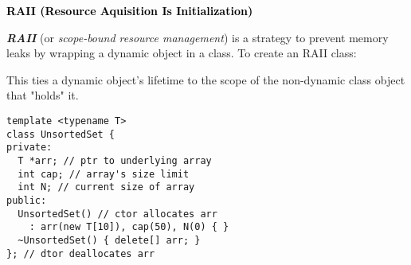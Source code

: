 \documentclass[6.6pt, twocolumn]{extarticle}
\newcommand{\blueheader}[1]{\textcolor{black}{\fontsize{7.00pt}{1.0}\bfseries{#1}}\vspace{0.2ex} }
\newcommand{\vocab}[1]{\textcolor{vocabcolor}{\bfseries{\emph{#1}}}}
\newcommand\mystrut{\rule[-0.5pt]{0pt}{0.875em}} %
\newcommand{\code}[1]{\mbox{%
    \fontsize{5.75pt}{1.17}\ttfamily\mystrut
    \tcbox[
        on line,
        boxsep=0.1pt, left=1.0pt, right=1.0pt, top=0.75pt, bottom=0.75pt,
        toprule=0pt, rightrule=0pt, bottomrule=0pt, leftrule=0pt,
        oversize=0pt, enlarge left by=0pt, enlarge right by=0pt,
        colframe=black!16,colback=inlinecodeBG,arc=0.8pt,boxrule=0.4pt,fontupper={\ttfamily\mystrut}
    ]{#1}%
}%
}
\begin{document}



\smallskip
\begin{minipage}[c]{5.5cm}
\blueheader{RAII (Resource Aquisition Is Initialization)}

\vocab{RAII} (or \textit{scope-bound resource management}) is a strategy to prevent memory leaks by wrapping a dynamic object in a class. To create an RAII class:
This ties a dynamic object's lifetime to the scope of the non-dynamic class object that "holds" it.
    \end{minipage}
    \hspace{0pt}
   \begin{minipage}[c]{4.7cm} 
   \smallskip
      \begin{tcolorbox}[top=-4pt,bottom=-4pt,left=-7.5pt,right=0pt,toptitle=-0.6mm,
  bottomtitle=-0.6mm,
  ]
              {
              \begin{lstlisting}[style = mystyle]
template <typename T>
class UnsortedSet {
private:
  T *arr; // ptr to underlying array
  int cap; // array's size limit
  int N; // current size of array
public:
  UnsortedSet() // ctor allocates arr
    : arr(new T[10]), cap(50), N(0) { }
  ~UnsortedSet() { delete[] arr; }
}; // dtor deallocates arr
\end{lstlisting}
}
   \end{tcolorbox}
    \end{minipage}
\end{document}
